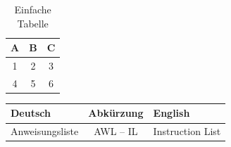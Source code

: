 \begin{table}[H]
    \centering
    \begin{tabular}{c c c} %
        \hline
        A & B & C \\ \hline
        1 & 2 & 3 \\
        4 & 5 & 6 \\ \hline
    \end{tabular}
    \caption{Einfache Tabelle}
    \label{tab:einfach}
\end{table}



\renewcommand{\arraystretch}{1.3} %
\begin{center}
\begin{tabular}{|l|c|l|}
\hline
\textbf{Deutsch} & \textbf{Abkürzung} & \textbf{English} \\ \hline

Anweisungsliste & AWL -- IL & Instruction List \\ \hline

\end{tabular}
\end{center}
